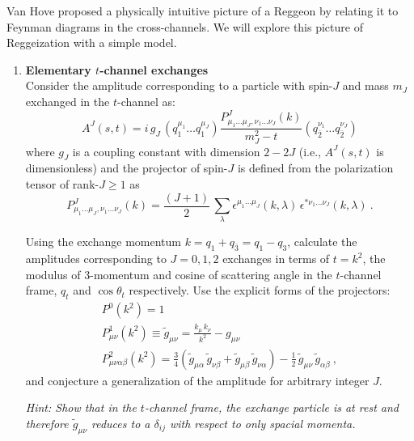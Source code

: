 Van Hove proposed a physically intuitive picture of a Reggeon by relating it to Feynman diagrams in the cross-channels. We will explore this picture of Reggeization with a simple model.

\begin{enumerate}

\item \textbf{Elementary $t$-channel exchanges} \\
Consider the amplitude corresponding to a particle with spin-$J$ and mass $m_J$  exchanged in the $t$-channel as:
    \begin{equation}   
        \label{eq:AJ}
        A^J(s,t) = i \, g_J \, \left( q_1^{\mu_1} \dots q_1^{\mu_J} \right) \frac{P^J_{\mu_1\dots\mu_J,\nu_1\dots\nu_J}(k)}{m_J^2 - t} \left( q_{\bar{2}}^{\nu_1} \dots q_{\bar{2}}^{\nu_J} \right) 
    \end{equation}
where $g_J$ is a coupling constant with dimension $2-2J$ (i.e., $A^J(s,t)$ is dimensionless) and the projector of spin-$J$ is defined from the polarization tensor of rank-$J\geq1$ as
    \begin{equation}
        P^J_{\mu_1\dots\mu_J,\nu_1\dots\nu_J}(k) = \frac{(J+1)}{2} \, \sum_{\lambda} 
         \epsilon^{\mu_1\dots\mu_J}(k,\lambda) \, \epsilon^{*\nu_1\dots\nu_J}(k,\lambda) ~.
    \end{equation}

Using the exchange momentum $k = q_1 + q_{\bar{3}} = q_1 - q_3$, calculate the amplitudes corresponding to $J=0,1,2$ exchanges in terms of $t= k^2$, the modulus of 3-momentum and cosine of scattering angle in the $t$-channel frame, $q_t$ and $\cos\theta_t$ respectively. Use the explicit forms of the projectors:
    \begin{gather}
        P^0(k^2) = 1 \\
        P^1_{\mu\nu}(k^2) \equiv \tilde{g}_{\mu\nu} =   \frac{ k_\mu \, k_\nu}{ k^2} - g_{\mu\nu}\\ 
        P^2_{\mu\nu\alpha\beta}(k^2) = \frac{3}{4}\left(\tilde{g}_{\mu\alpha} \, \tilde{g}_{\nu\beta} + \tilde{g}_{\mu\beta} \, \tilde{g}_{\nu\alpha}\right) - \frac{1}{2} \, \tilde{g}_{\mu\nu} \, \tilde{g}_{\alpha\beta} ~,
    \end{gather}
and conjecture a generalization of the amplitude for arbitrary integer $J$. 

\noindent\textit{Hint: Show that in the $t$-channel frame, the exchange particle is at rest and therefore $\tilde{g}_{\mu\nu}$ reduces to a $\delta_{ij}$ with respect to only spacial momenta.} 


\end{enumerate}
